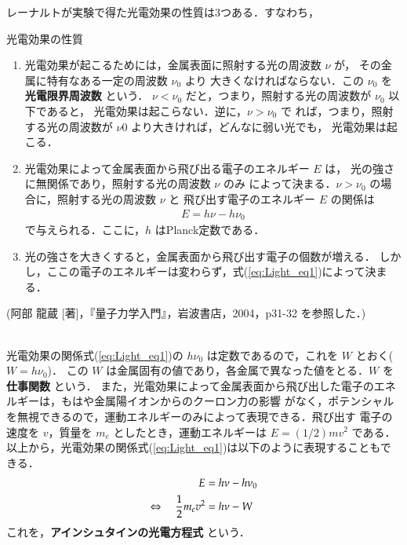             レーナルトが実験で得た光電効果の性質は3つある．すなわち，\\
                \begin{itembox}[l]{光電効果の性質}
                    \begin{enumerate}
                    \item 光電効果が起こるためには，金属表面に照射する光の周波数  $\nu$  が，
                            その金属に特有なある一定の周波数 $\nu_{0}$ より
                            大きくなければならない．この $\nu_{0}$ を \textbf{光電限界周波数} という．
                            $\nu < \nu_{0}$ だと，つまり，照射する光の周波数が $\nu_{0}$ 以下であると，
                            光電効果は起こらない．逆に，$\nu > \nu_{0}$ で
                            れば，つまり，照射する光の周波数が $\nu{0}$ より大きければ，どんなに弱い光でも，
                            光電効果は起こる．
                    \item 光電効果によって金属表面から飛び出る電子のエネルギー $E$ は，
                            光の強さに無関係であり，照射する光の周波数 $\nu$ のみ
                            によって決まる．$\nu > \nu_{0}$ の場合に，照射する光の周波数 $\nu$ と
                            飛び出す電子のエネルギー $E$ の関係は
                            \begin{align}\label{eq:Light_eq1}
                                E = h\nu -h\nu_{0}
                            \end{align}
                            で与えられる．ここに，$h$ はPlanck定数である．
                    \item 光の強さを大きくすると，金属表面から飛び出す電子の個数が増える．
                            しかし，ここの電子のエネルギーは変わらず，式(\ref{eq:Light_eq1})によって決まる．
                    \end{enumerate}
                    (阿部 龍蔵 [著]，『量子力学入門』，岩波書店，2004，p31-32 を参照した．)
                \end{itembox}\\

            光電効果の関係式(\ref{eq:Light_eq1})の $h\nu_{0}$ は定数であるので，これを $W$ とおく($W=h\nu_{0}$)．
            この $W$ は金属固有の値であり，各金属で異なった値をとる．$W$ を \textbf{仕事関数} という．
            また，光電効果によって金属表面から飛び出した電子のエネルギーは，もはや金属陽イオンからのクーロン力の影響
            がなく，ポテンシャルを無視できるので，運動エネルギーのみによって表現できる．飛び出す
            電子の速度を $v$，質量を $m_{e}$ としたとき，運動エネルギーは $E=(1/2)mv^{2}$ である．
            以上から，光電効果の関係式(\ref{eq:Light_eq1})は以下のように表現することもできる．
                                    \begin{align}\label{eq:Light_eq2}
                                        E &= h\nu -h\nu_{0} \notag \\
                                        \Leftrightarrow \quad \frac{1}{2}m_{e}v^{2} &= h\nu - W
                                    \end{align}
            これを，\textbf{アインシュタインの光電方程式} という．


